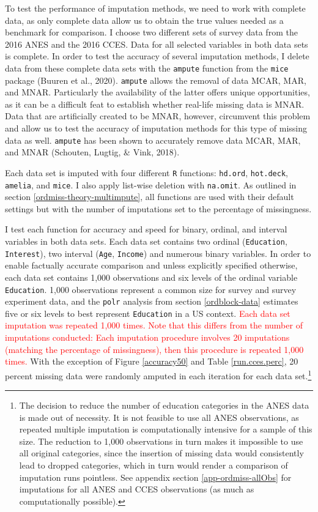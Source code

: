 \documentclass[12pt,econ]{sources/authesis}
\begin{document}
To test the performance of imputation methods, we need to work with complete data, as only complete data allow us to obtain the true values needed as a benchmark for comparison. I choose two different sets of survey data from the 2016 ANES and the 2016 CCES. Data for all selected variables in both data sets is complete. In order to test the accuracy of several imputation methods, I delete data from these complete data sets with the \texttt{ampute} function from the \texttt{mice} package (Buuren et al., 2020). \texttt{ampute} allows the removal of data MCAR, MAR, and MNAR. Particularly the availability of the latter offers unique opportunities, as it can be a difficult feat to establish whether real-life missing data is MNAR. Data that are artificially created to be MNAR, however, circumvent this problem and allow us to test the accuracy of imputation methods for this type of missing data as well. \texttt{ampute} has been shown to accurately remove data MCAR, MAR, and MNAR (Schouten, Lugtig, \& Vink, 2018).

Each data set is imputed with four different \texttt{R} functions: \texttt{hd.ord}, \texttt{hot.deck}, \texttt{amelia}, and \texttt{mice}. I also apply list-wise deletion with \texttt{na.omit}. As outlined in section \ref{ordmiss-theory-multimpute}, all functions are used with their default settings but with the number of imputations set to the percentage of missingness.

I test each function for accuracy and speed for binary, ordinal, and interval variables in both data sets. Each data set contains two ordinal (\texttt{Education}, \texttt{Interest}), two interval (\texttt{Age}, \texttt{Income}) and numerous binary variables. In order to enable factually accurate comparison and unless explicitly specified otherwise, each data set contains 1,000 observations and six levels of the ordinal variable \texttt{Education}. 1,000 observations represent a common size for survey and survey experiment data, and the \texttt{polr} analysis from section \ref{ordblock-data} estimates five or six levels to best represent \texttt{Education} in a US context. \textcolor{red}{Each data set imputation was repeated 1,000 times. Note that this differs from the number of imputations conducted: Each imputation procedure involves 20 imputations (matching the percentage of missingness), then this procedure is repeated 1,000 times.} With the exception of Figure \ref{accuracy50} and Table \ref{run.cces.perc}, 20 percent missing data were randomly amputed in each iteration for each data set.\footnote{The decision to reduce the number of education categories in the ANES data is made out of necessity. It is not feasible to use all ANES observations, as repeated multiple imputation is computationally intensive for a sample of this size. The reduction to 1,000 observations in turn makes it impossible to use all original categories, since the insertion of missing data would consistently lead to dropped categories, which in turn would render a comparison of imputation runs pointless. See appendix section \ref{app-ordmiss-allObs} for imputations for all ANES and CCES observations (as much as computationally possible).}
\end{document}
